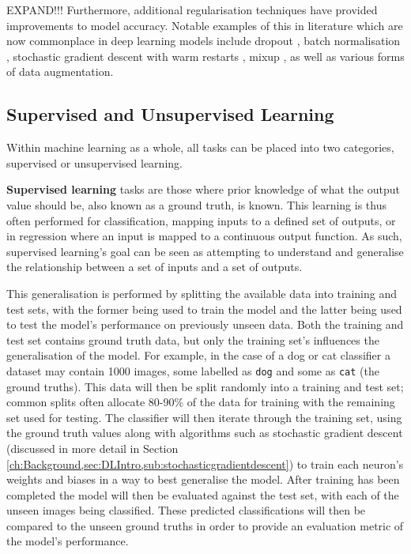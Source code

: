 EXPAND!!!
Furthermore, additional regularisation techniques have provided improvements to model accuracy. Notable examples of this in literature which are now commonplace in deep learning models include dropout \cite{srivastava_dropout:_2014}, batch normalisation \cite{ioffe_batch_2015}, stochastic gradient descent with warm restarts \cite{loshchilov_sgdr:_2016}, mixup \cite{zhang_mixup:_2017}, as well as various forms of data augmentation. 

\subsection{Supervised and Unsupervised Learning}\label{ch:Background,sec:DLIntro,sub:supervisedVsUnsupervisedLearning}
Within machine learning as a whole, all tasks can be placed into two categories, supervised or unsupervised learning. 

\textbf{Supervised learning} tasks are those where prior knowledge of what the output value should be, also known as a ground truth, is known. This learning is thus often performed for classification, mapping inputs to a defined set of outputs, or in regression where an input is mapped to a continuous output function. As such, supervised learning's goal can be seen as attempting to understand and generalise the relationship between a set of inputs and a set of outputs. 

This generalisation is performed by splitting the available data into training and test sets, with the former being used to train the model and the latter being used to test the model's performance on previously unseen data. Both the training and test set contains ground truth data, but only the training set's influences the generalisation of the model. For example, in the case of a dog or cat classifier a dataset may contain 1000 images, some labelled as \texttt{dog} and some as \texttt{cat} (the ground truths). This data will then be split randomly into a training and test set; common splits often allocate 80-90\% of the data for training with the remaining set used for testing. The classifier will then iterate through the training set, using the ground truth values along with algorithms such as stochastic gradient descent (discussed in more detail in Section \ref{ch:Background,sec:DLIntro,sub:stochasticgradientdescent}) to train each neuron's weights and biases in a way to best generalise the model. After training has been completed the model will then be evaluated against the test set, with each of the unseen images being classified. These predicted classifications will then be compared to the unseen ground truths in order to provide an evaluation metric of the model's performance. 

